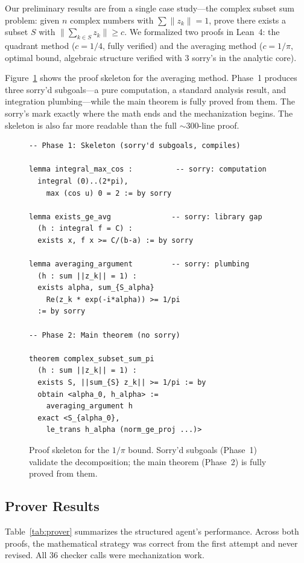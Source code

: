 Our preliminary results are from a single case study---the complex subset sum problem: given $n$ complex numbers with $\sum\|z_k\| = 1$, prove there exists a subset $S$ with $\|\sum_{k\in S} z_k\| \geq c$. We formalized two proofs in Lean~4: the quadrant method ($c = 1/4$, fully verified) and the averaging method ($c = 1/\pi$, optimal bound, algebraic structure verified with 3 sorry's in the analytic core).

Figure~\ref{fig:skeleton} shows the proof skeleton for the averaging method. Phase~1 produces three sorry'd subgoals---a pure computation, a standard analysis result, and integration plumbing---while the main theorem is fully proved from them. The sorry's mark exactly where the math ends and the mechanization begins. The skeleton is also far more readable than the full $\sim$300-line proof.

\begin{figure}[h]
\begin{lstlisting}
-- Phase 1: Skeleton (sorry'd subgoals, compiles)

lemma integral_max_cos :          -- sorry: computation
  integral (0)..(2*pi),
    max (cos u) 0 = 2 := by sorry

lemma exists_ge_avg              -- sorry: library gap
  (h : integral f = C) :
  exists x, f x >= C/(b-a) := by sorry

lemma averaging_argument         -- sorry: plumbing
  (h : sum ||z_k|| = 1) :
  exists alpha, sum_{S_alpha}
    Re(z_k * exp(-i*alpha)) >= 1/pi
  := by sorry

-- Phase 2: Main theorem (no sorry)

theorem complex_subset_sum_pi
  (h : sum ||z_k|| = 1) :
  exists S, ||sum_{S} z_k|| >= 1/pi := by
  obtain <alpha_0, h_alpha> :=
    averaging_argument h
  exact <S_{alpha_0},
    le_trans h_alpha (norm_ge_proj ...)>
\end{lstlisting}
\caption{Proof skeleton for the $1/\pi$ bound. Sorry'd subgoals (Phase~1) validate the decomposition; the main theorem (Phase~2) is fully proved from them.}
\label{fig:skeleton}
\end{figure}

\subsection{Prover Results}

Table~\ref{tab:prover} summarizes the structured agent's performance. Across both proofs, the mathematical strategy was correct from the first attempt and never revised. All 36 checker calls were mechanization work.

